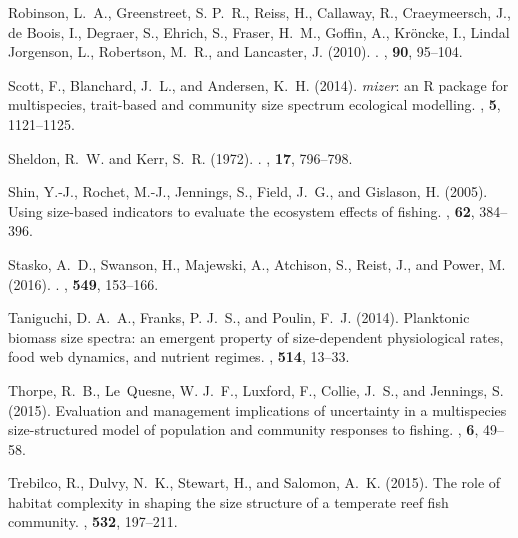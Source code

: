 \begin{thebibliography}{}
Robinson, L.~A., Greenstreet, S. P.~R., Reiss, H., Callaway, R., Craeymeersch,
  J., {de Boois}, I., Degraer, S., Ehrich, S., Fraser, H.~M., Goffin, A.,
  Kr\"oncke, I., {Lindal Jorgenson}, L., Robertson, M.~R., and Lancaster, J.
  (2010).
.
, {\bf 90}, 95--104.

Scott, F., Blanchard, J.~L., and Andersen, K.~H. (2014).
\newblock \emph{mizer}: an {R} package for multispecies, trait-based and
  community size spectrum ecological modelling.
, {\bf 5}, 1121--1125.

Sheldon, R.~W. and Kerr, S.~R. (1972).
.
, {\bf 17}, 796--798.

Shin, Y.-J., Rochet, M.-J., Jennings, S., Field, J.~G., and Gislason, H.
  (2005).
\newblock Using size-based indicators to evaluate the ecosystem effects of
  fishing.
, {\bf 62}, 384--396.

Stasko, A.~D., Swanson, H., Majewski, A., Atchison, S., Reist, J., and Power,
  M. (2016).
.
, {\bf 549}, 153--166.

Taniguchi, D. A.~A., Franks, P. J.~S., and Poulin, F.~J. (2014).
\newblock Planktonic biomass size spectra: an emergent property of
  size-dependent physiological rates, food web dynamics, and nutrient regimes.
, {\bf 514}, 13--33.

Thorpe, R.~B., {Le~Quesne}, W. J.~F., Luxford, F., Collie, J.~S., and Jennings,
  S. (2015).
\newblock Evaluation and management implications of uncertainty in a
  multispecies size-structured model of population and community responses to
  fishing.
, {\bf 6}, 49--58.

Trebilco, R., Dulvy, N.~K., Stewart, H., and Salomon, A.~K. (2015).
\newblock The role of habitat complexity in shaping the size structure of a
  temperate reef fish community.
, {\bf 532}, 197--211.


\end{thebibliography}
